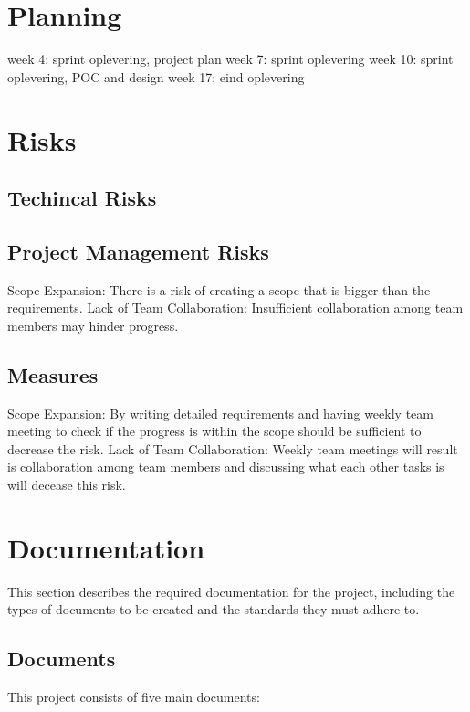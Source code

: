 \documentclass{projdoc}
\begin{document}
\section{Planning}
week 4: sprint oplevering, project plan
week 7: sprint oplevering
week 10: sprint oplevering, POC and design
week 17: eind oplevering



\section{Risks}
\subsection{Techincal Risks}
\subsection{Project Management Risks}
Scope Expansion: There is a risk of creating a scope that is bigger than the requirements.
Lack of Team Collaboration: Insufficient collaboration among team members 
may hinder progress.
\subsection{Measures}
Scope Expansion: By writing detailed requirements and having weekly team meeting to check if the progress is within the scope should be sufficient to decrease the risk.
Lack of Team Collaboration: Weekly team meetings will result is collaboration among team members and discussing what each other tasks is will decease this risk.


\section{Documentation}

This section describes the required documentation for the project, including the
 types of documents to be created and the standards they must adhere to.

\subsection{Documents}

This project consists of five main documents:\noparbreak
\end{document}

